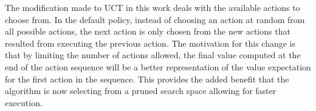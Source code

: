 The modification made to UCT in this work deals with the available actions to choose from.  In the default policy, instead of choosing an action at random from all possible actions, the next action is only chosen from the new actions that resulted from executing the previous action.  The motivation for this change is that by limiting the number of actions allowed, the final value computed at the end of the action sequence will be a better representation of the value expectation for the first action in the sequence.  This provides the added benefit that the algorithm is now selecting from a pruned search space allowing for faster execution.